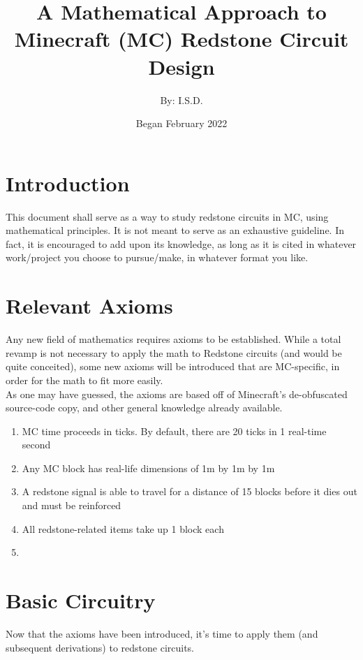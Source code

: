 \documentclass{article}
\title{A Mathematical Approach to Minecraft (MC) Redstone Circuit Design}
\author{By: I.S.D.}
\date{Began February 2022}
\begin{document}
\maketitle

\section{Introduction}

This document shall serve as a way to study redstone circuits in MC, using mathematical principles. It is not meant to serve as an exhaustive guideline. In fact, it is encouraged to add upon its knowledge, as long as it is cited in whatever work/project you choose to pursue/make, in whatever format you like.

\section{Relevant Axioms}
Any new field of mathematics requires axioms to be established. While a total revamp is not necessary to apply the math to Redstone circuits (and would be quite conceited), some new axioms will be introduced that are MC-specific, in order for the math to fit more easily. \\

\noindent
As one may have guessed, the axioms are based off of Minecraft's de-obfuscated source-code copy, and other general knowledge already available.

\begin{enumerate}
\item MC time proceeds in ticks. By default, there are 20 ticks in 1 real-time second
\item Any MC block has real-life dimensions of 1m by 1m by 1m
\item A redstone signal is able to travel for a distance of 15 blocks before it dies out and must be reinforced
\item All redstone-related items take up 1 block each
\item 
\end{enumerate}

\section{Basic Circuitry}
Now that the axioms have been introduced, it's time to apply them (and subsequent derivations) to redstone circuits.
\end{document}

